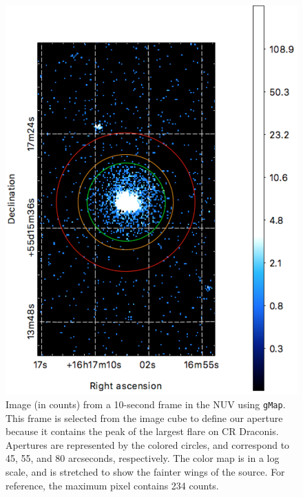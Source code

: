 \documentclass[preprint]{aastex}
\begin{document}
\clearpage
\begin{figure}[h]
\includegraphics[scale=0.75]{Fig12.pdf}
\caption{Image (in counts) from a 10-second frame in the NUV using \texttt{gMap}.  This frame is selected from the image cube to define our aperture because it contains the peak of the largest flare on CR Draconis.  Apertures are represented by the colored circles, and correspond to 45, 55, and 80 arcseconds, respectively.  The color map is in a log scale, and is stretched to show the fainter wings of the source.  For reference, the maximum pixel contains 234 counts.\label{crdracoadd}}
\end{figure}
\clearpage
\end{document}
